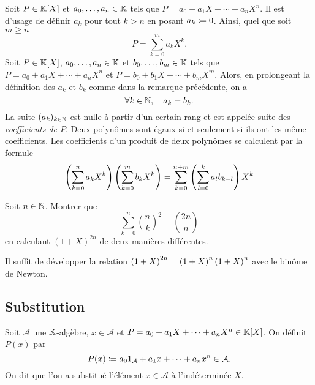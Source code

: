 \documentclass{magnolia}
\begin{document}
\begin{remarques}
\remarque Soit $P\in\polyK$ et $a_0,\ldots,a_n\in\mathbb{K}$ tels que
  $P=a_0+a_1 X+\cdots+a_n X^n$.
  Il est d'usage de définir $a_k$ pour tout $k>n$ en posant $a_k\coloneqq 0$. Ainsi,
  quel que soit $m\geq n$
  \[P=\sum_{k=0}^m a_kX^k.\]
\remarque Soit $P\in\polyK$, $a_0,\ldots,a_n\in\mathbb{K}$ et $b_0,\ldots,b_m\in\mathbb{K}$ tels
  que $P=a_0+a_1X+\cdots+a_n X^n$ et $P=b_0+b_1X+\cdots+b_m X^m$. Alors,
  en prolongeant la définition des $a_k$ et $b_k$ comme dans la remarque précédente, on a
  \[\forall k\in\mathbb{N},\quad a_k=b_k.\]
  La suite $(a_k)_{k\in\mathbb{N}}$ est nulle à partir d'un certain rang et est appelée suite des \emph{coefficients de $P$}.
  Deux polynômes sont égaux si
  et seulement si ils ont les même coefficients.
\remarque Les coefficients d'un produit de deux polynômes se calculent par
  la formule
  \[\left(\sum_{k=0}^n a_k X^k\right)\left(\sum_{k=0}^m b_k X^k\right)=
    \sum_{k=0}^{n+m} \left(\sum_{l=0}^k a_l b_{k-l}\right)X^k\]
\end{remarques}

\begin{exoUnique}
\exo Soit $n\in\mathbb{N}$. Montrer que
  \[\sum_{k=0}^{n} \binom{n}{k}^2=\binom{2n}{n}\]
  en calculant $(1+X)^{2n}$ de deux manières différentes.
  \begin{sol}
  Il suffit de développer la relation $\left(1+X\right)^{2n}=\left(1+X\right)^n\left(1+X\right)^n$ avec
  le binôme de Newton.
    \end{sol}
  
\end{exoUnique}

\subsection{Substitution}

\begin{definition}
Soit $\mathcal{A}$ une $\mathbb{K}$-algèbre, $x\in\mathcal{A}$ et
$P=a_0+a_1X+\cdots+a_nX^n\in\polyK$. On définit $P(x)$ par
\[P(x)\coloneqq a_0 1_{\mathcal{A}}+a_1 x+\cdots+a_n x^n\in\mathcal{A}.\]
On dit que l'on a substitué l'élément $x\in\mathcal{A}$ à l'indéterminée $X$.
\end{definition}
\end{document}
